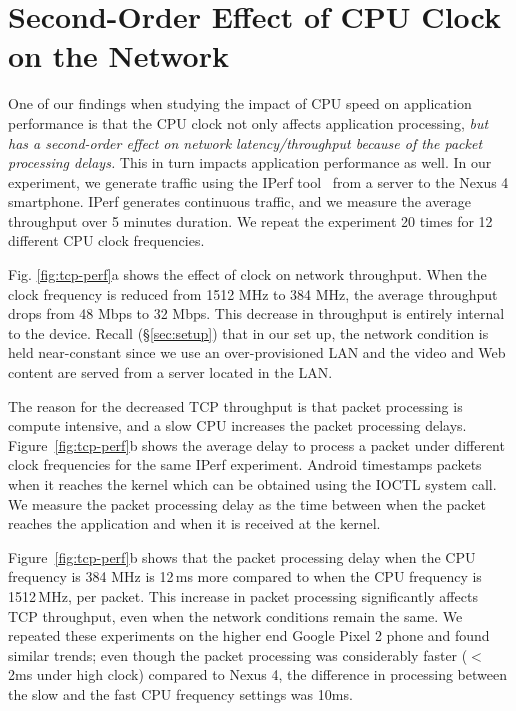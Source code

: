 \section{Second-Order Effect of CPU Clock on the Network} \label{label:throughput}

One of our findings when studying the impact of CPU speed on application performance is that 
the CPU clock not only affects application processing, {\em but has a second-order effect on network 
latency/throughput because of the packet processing delays.} This in turn impacts
application performance as well. In our experiment, we generate traffic using the IPerf tool~\cite{iperf-2015} from a server to the Nexus 4 smartphone. IPerf generates continuous traffic, and we measure the average throughput over 5 minutes duration. We repeat the experiment 20 times for 12 different CPU clock frequencies. 

Fig. \ref{fig:tcp-perf}a shows the effect of clock on network throughput. When the clock frequency is reduced from 1512 MHz to 384 MHz, the average throughput drops from 48 Mbps to 32 Mbps. This decrease in throughput is entirely internal to the device. Recall (\S\ref{sec:setup}) that in our set up, the network condition is held near-constant since we use an over-provisioned LAN and the video and Web content are served from a server located in the LAN. 

The reason for the decreased TCP throughput is that packet processing is compute intensive, and a slow CPU increases the packet processing delays. Figure~\ref{fig:tcp-perf}b shows the average delay to process a packet under different clock frequencies for the same IPerf experiment. Android timestamps packets when it reaches the kernel which can be obtained using the IOCTL system call. We measure the packet processing delay as the time between when the packet reaches the application and when it is received at the kernel.

Figure~\ref{fig:tcp-perf}b shows that the packet processing delay when the CPU frequency is 384 MHz is 
12\,ms more compared to when the CPU frequency is 1512\,MHz, per packet. This increase in packet processing significantly affects TCP throughput, even when the network conditions remain the same. We repeated these experiments on the higher end Google Pixel 2 phone and found similar trends; even though the packet processing was considerably faster ($<$ 2ms under high clock) compared to Nexus 4, the difference in processing between the slow and the fast CPU frequency settings was 10ms.  

